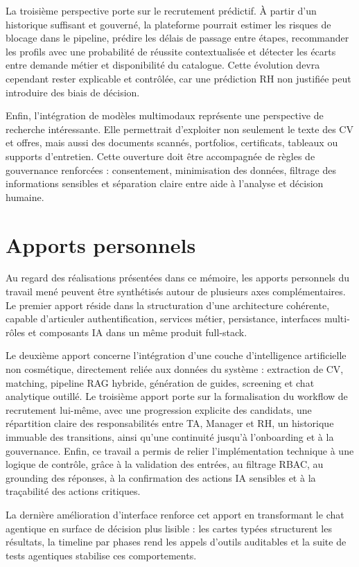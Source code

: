 La troisième perspective porte sur le recrutement prédictif. À partir d'un historique suffisant et gouverné, la plateforme pourrait estimer les risques de blocage dans le pipeline, prédire les délais de passage entre étapes, recommander les profils avec une probabilité de réussite contextualisée et détecter les écarts entre demande métier et disponibilité du catalogue. Cette évolution devra cependant rester explicable et contrôlée, car une prédiction RH non justifiée peut introduire des biais de décision.

Enfin, l'intégration de modèles multimodaux représente une perspective de recherche intéressante. Elle permettrait d'exploiter non seulement le texte des CV et offres, mais aussi des documents scannés, portfolios, certificats, tableaux ou supports d'entretien. Cette ouverture doit être accompagnée de règles de gouvernance renforcées : consentement, minimisation des données, filtrage des informations sensibles et séparation claire entre aide à l'analyse et décision humaine.
\section*{Apports personnels}
Au regard des réalisations présentées dans ce mémoire, les apports personnels du travail mené peuvent être synthétisés autour de plusieurs axes complémentaires. Le premier apport réside dans la structuration d'une architecture cohérente, capable d'articuler authentification, services métier, persistance, interfaces multi-rôles et composants IA dans un même produit full-stack.

Le deuxième apport concerne l'intégration d'une couche d'intelligence artificielle non cosmétique, directement reliée aux données du système : extraction de CV, matching, pipeline RAG hybride, génération de guides, screening et chat analytique outillé. Le troisième apport porte sur la formalisation du workflow de recrutement lui-même, avec une progression explicite des candidats, une répartition claire des responsabilités entre TA, Manager et RH, un historique immuable des transitions, ainsi qu'une continuité jusqu'à l'onboarding et à la gouvernance. Enfin, ce travail a permis de relier l'implémentation technique à une logique de contrôle, grâce à la validation des entrées, au filtrage RBAC, au grounding des réponses, à la confirmation des actions IA sensibles et à la traçabilité des actions critiques.

La dernière amélioration d'interface renforce cet apport en transformant le chat agentique en surface de décision plus lisible : les cartes typées structurent les résultats, la timeline par phases rend les appels d'outils auditables et la suite de tests agentiques stabilise ces comportements.



